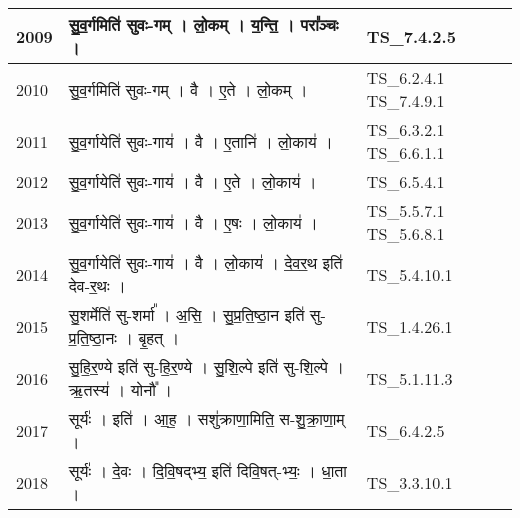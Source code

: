 \documentclass[17pt]{extarticle}
\begin{document}
\begin{longtable}{||p{0.4in}||p{4.9in}||p{0.9in}||}
    2009 & सु॒व॒र्गमिति॑ सुवः{-}गम्   ।   लो॒कम्   ।   य॒न्ति॒   ।   परा᳚ञ्चः   ।    & TS\_7.4.2.5       \\
    
    \hline
        
    2010 & सु॒व॒र्गमिति॑ सुवः{-}गम्   ।   वै   ।   ए॒ते   ।   लो॒कम्   ।    & TS\_6.2.4.1 TS\_7.4.9.1       \\
    
    \hline
        
    2011 & सु॒व॒र्गायेति॑ सुवः{-}गाय॑   ।   वै   ।   ए॒तानि॑   ।   लो॒काय॑   ।    & TS\_6.3.2.1 TS\_6.6.1.1       \\
    
    \hline
        
    2012 & सु॒व॒र्गायेति॑ सुवः{-}गाय॑   ।   वै   ।   ए॒ते   ।   लो॒काय॑   ।    & TS\_6.5.4.1       \\
    
    \hline
        
    2013 & सु॒व॒र्गायेति॑ सुवः{-}गाय॑   ।   वै   ।   ए॒षः   ।   लो॒काय॑   ।    & TS\_5.5.7.1 TS\_5.6.8.1       \\
    
    \hline
        
    2014 & सु॒व॒र्गायेति॑ सुवः{-}गाय॑   ।   वै   ।   लो॒काय॑   ।   दे॒व॒र॒थ इति॑ देव{-}र॒थः   ।    & TS\_5.4.10.1       \\
    
    \hline
        
    2015 & सु॒शर्मेति॑ सु{-}शर्मा᳚   ।   अ॒सि॒   ।   सु॒प्र॒ति॒ष्ठा॒न इति॑ सु{-}प्र॒ति॒ष्ठा॒नः   ।   बृ॒हत्   ।    & TS\_1.4.26.1       \\
    
    \hline
        
    2016 & सु॒हि॒र॒ण्ये इति॑ सु{-}हि॒र॒ण्ये   ।   सु॒शि॒ल्पे इति॑ सु{-}शि॒ल्पे   ।   ऋ॒तस्य॑   ।   योनौ᳚   ।    & TS\_5.1.11.3       \\
    
    \hline
        
    2017 & सूर्यः॑   ।   इति॑   ।   आ॒ह॒   ।   सशु॑क्राणा॒मिति॒ स{-}शु॒क्रा॒णा॒म्   ।    & TS\_6.4.2.5       \\
    
    \hline
        
    2018 & सूर्यः॑   ।   दे॒वः   ।   दि॒वि॒षद्भ्य॒ इति॑ दिवि॒षत्{-}भ्यः॒   ।   धा॒ता   ।    & TS\_3.3.10.1       \\
    
    \hline
        

\end{longtable}
\end{document}
